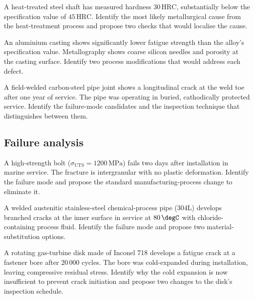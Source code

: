 \begin{exercise}
A heat-treated steel shaft has measured hardness $30\,\text{HRC}$,
substantially below the specification value of $45\,\text{HRC}$.
Identify the most likely metallurgical cause from the heat-treatment
process and propose two checks that would localise the cause.
\end{exercise}

\begin{exercise}
An aluminium casting shows significantly lower fatigue strength
than the alloy's specification value. Metallography shows coarse
silicon needles and porosity at the casting surface. Identify two
process modifications that would address each defect.
\end{exercise}

\begin{exercise}
A field-welded carbon-steel pipe joint shows a longitudinal crack at
the weld toe after one year of service. The pipe was operating in
buried, cathodically protected service. Identify the failure-mode
candidates and the inspection technique that distinguishes between
them.
\end{exercise}

\subsection*{Failure analysis}

\begin{exercise}
A high-strength bolt ($\sigma_{\text{UTS}} = 1200\,\text{MPa}$) fails
two days after installation in marine service. The fracture is
intergranular with no plastic deformation. Identify the failure mode
and propose the standard manufacturing-process change to eliminate
it.
\end{exercise}

\begin{exercise}
A welded austenitic stainless-steel chemical-process pipe (304L)
develops branched cracks at the inner surface in service at $80\,
\degC$ with chloride-containing process fluid. Identify the failure
mode and propose two material-substitution options.
\end{exercise}

\begin{exercise}
A rotating gas-turbine disk made of Inconel 718 develops a fatigue
crack at a fastener bore after $20\,000$ cycles. The bore was
cold-expanded during installation, leaving compressive residual
stress. Identify why the cold expansion is now insufficient to
prevent crack initiation and propose two changes to the disk's
inspection schedule.
\end{exercise}

